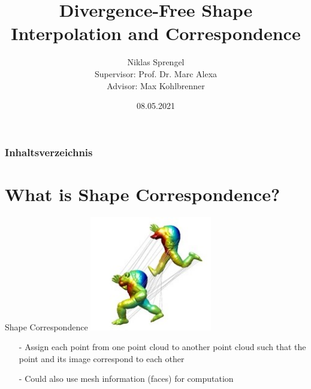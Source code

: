 \documentclass[xcolor=dvipsnames]{beamer}
\title[Divergence-Free Shape Interpolation]{Divergence-Free Shape Interpolation and Correspondence}
\author[CG]{Niklas Sprengel \\ Supervisor: Prof. Dr. Marc Alexa\\Advisor: Max Kohlbrenner}
\institute{TU Berlin}
\date{08.05.2021}
\begin{document}
\begin{frame}
  \titlepage
\end{frame}

\begin{frame}
\frametitle{Inhaltsverzeichnis}
\tableofcontents
\end{frame}

\section{What is Shape Correspondence?}
\begin{frame}{Shape Correspondence}
\includegraphics[height=5cm]{Pictures/ShapeCorrespondenceArmadillo.jpg}
\begin{enumerate}
\item[-] Assign each point from one point cloud to another point cloud such that the point and its image correspond to each other
\item[-] Could also use mesh information (faces) for computation
\end{enumerate}
\end{frame}
\end{document}

